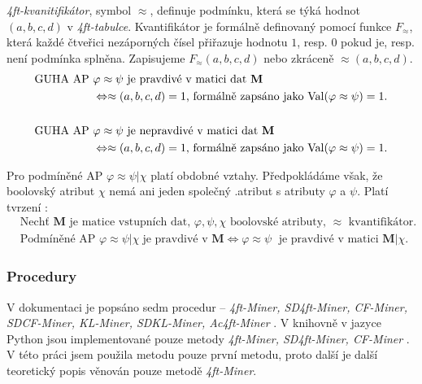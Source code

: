 \emph{4ft-kvanitifikátor}, symbol $\approx$, definuje podmínku, která se týká hodnot $(a,b,c,d)$ v \emph{4ft-tabulce}. Kvantifikátor je formálně definovaný pomocí funkce $F_\approx$, která každé čtveřici nezáporných čísel přiřazuje hodnotu $1$, resp. $0$ pokud je, resp. není podmínka splněna. Zapisujeme $F_\approx(a,b,c,d)$ nebo zkráceně $\approx(a,b,c,d)$.\cite{bib:GUHA}
\begin{equation}
\begin{aligned}
    \mbox{GUHA AP } & \varphi \approx \psi \mbox{ je pravdivé v matici dat }\mathbf{M} \\
    & \Leftrightarrow \approx(a,b,c,d) = 1 \mbox{, formálně zapsáno jako } \mathrm{Val}(\varphi \approx \psi) = 1.   \\
    \vspace*{.5em} \\
    \mbox{GUHA AP } & \varphi \approx \psi \mbox{ je nepravdivé v matici dat }\mathbf{M} \\
   & \Leftrightarrow \approx(a,b,c,d) = 1 \mbox{, formálně zapsáno jako } \mathrm{Val}(\varphi \approx \psi) = 1. 
\end{aligned}
\end{equation}

Pro podmíněné AP $\varphi \approx \psi | \chi$ platí obdobné vztahy. Předpokládáme však, že boolovský atribut $\chi$ nemá ani jeden společný .atribut s atributy $\varphi$ a $\psi$. Platí tvrzení \cite{bib:GUHA}:
\begin{equation}
    \begin{aligned}
        &\mbox{Nechť } \mathbf{M} \mbox{ je matice vstupních dat, } \varphi,\psi,\chi  \mbox{ boolovské atributy, } \approx \mbox{ kvantifikátor.} \\
        & \mbox{Podmíněné AP } \varphi \approx \psi | \chi \; \mbox{je pravdivé v } \mathbf{M} \Leftrightarrow \varphi \approx \psi \; \mbox{ je pravdivé v matici } \mathbf{M|}\chi.
    \end{aligned}
\end{equation}

\subsubsection{Procedury}

V dokumentaci \cite{bib:GUHA} je popsáno sedm procedur -- \emph{4ft-Miner,  SD4ft-Miner, CF-Miner, SDCF-Miner,  KL-Miner,  SDKL-Miner,  Ac4ft-Miner} \cite{bib:GUHA}. V knihovně v jazyce Python jsou implementované pouze metody \emph{4ft-Miner, SD4ft-Miner, CF-Miner} \cite{bib:GUHAclever}. V této práci jsem použila metodu pouze první metodu, proto další je další teoretický popis věnován pouze metodě \emph{4ft-Miner}.

